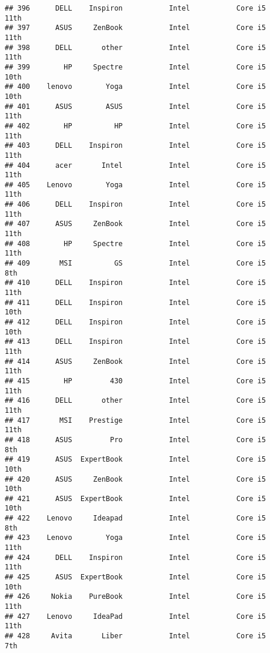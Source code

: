 \documentclass[
]{article}
\begin{document}
\begin{verbatim}
## 396      DELL    Inspiron           Intel           Core i5            11th
## 397      ASUS     ZenBook           Intel           Core i5            11th
## 398      DELL       other           Intel           Core i5            11th
## 399        HP     Spectre           Intel           Core i5            10th
## 400    lenovo        Yoga           Intel           Core i5            10th
## 401      ASUS        ASUS           Intel           Core i5            11th
## 402        HP          HP           Intel           Core i5            11th
## 403      DELL    Inspiron           Intel           Core i5            11th
## 404      acer       Intel           Intel           Core i5            11th
## 405    Lenovo        Yoga           Intel           Core i5            11th
## 406      DELL    Inspiron           Intel           Core i5            11th
## 407      ASUS     ZenBook           Intel           Core i5            11th
## 408        HP     Spectre           Intel           Core i5            11th
## 409       MSI          GS           Intel           Core i5             8th
## 410      DELL    Inspiron           Intel           Core i5            11th
## 411      DELL    Inspiron           Intel           Core i5            10th
## 412      DELL    Inspiron           Intel           Core i5            10th
## 413      DELL    Inspiron           Intel           Core i5            11th
## 414      ASUS     ZenBook           Intel           Core i5            11th
## 415        HP         430           Intel           Core i5            11th
## 416      DELL       other           Intel           Core i5            11th
## 417       MSI    Prestige           Intel           Core i5            11th
## 418      ASUS         Pro           Intel           Core i5             8th
## 419      ASUS  ExpertBook           Intel           Core i5            10th
## 420      ASUS     ZenBook           Intel           Core i5            10th
## 421      ASUS  ExpertBook           Intel           Core i5            10th
## 422    Lenovo     Ideapad           Intel           Core i5             8th
## 423    Lenovo        Yoga           Intel           Core i5            11th
## 424      DELL    Inspiron           Intel           Core i5            11th
## 425      ASUS  ExpertBook           Intel           Core i5            10th
## 426     Nokia    PureBook           Intel           Core i5            11th
## 427    Lenovo     IdeaPad           Intel           Core i5            11th
## 428     Avita       Liber           Intel           Core i5             7th

\end{verbatim}
\end{document}
